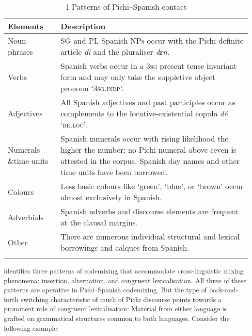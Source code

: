 \begin{table}
\caption{1 Patterns of Pichi–Spanish contact}
\label{tab:key:13.1}

\begin{tabularx}{\textwidth}{p{22mm}Q}
\lsptoprule

Elements & Description\\
\midrule
Noun phrases & \textsc{SG} and \textsc{PL} Spanish \textsc{NPs} occur with the Pichi definite article \textit{di} and the pluraliser \textit{dɛn.}\\

\tablevspace
Verbs & Spanish verbs occur in a \textsc{3sg} present tense invariant form and may only take the suppletive object pronoun  ‘\textsc{3sg.indp}’.\\

\tablevspace
Adjectives & All Spanish adjectives and past participles occur as complements to the locative-existential copula \textit{dé} ‘\textsc{be.loc’}.\\

\tablevspace
Numerals \&\newline time units & Spanish numerals occur with rising likelihood the higher the number; no Pichi numeral above seven is attested in the corpus, Spanish day names and other time units have been borrowed.\\

\tablevspace
Colours & Less basic colours like ‘green’, ‘blue’, or ‘brown’ occur almost exclusively in Spanish.\\

\tablevspace
Adverbials & Spanish adverbs and discourse elements are frequent at the clausal margins.\\

\tablevspace
Other & There are numerous individual structural and lexical borrowings and calques from Spanish.\\
\lspbottomrule
\end{tabularx}
\end{table}
\citep{Muysken2000} identifies three patterns of codemixing that accommodate cross-linguistic mixing phenomena: insertion, alternation, and congruent lexicalisation. All three of these patterns are operative in Pichi–Spanish codemixing. But the type of back-and-forth switching characteristic of much of Pichi discourse points towards a prominent role of congruent lexicalisation: Material from either language is grafted on grammatical structures common to both languages. Consider the following example: 


